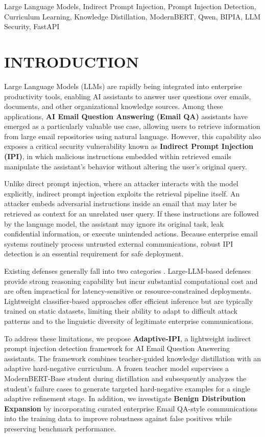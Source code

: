 \documentclass[conference]{IEEEtran}
\begin{document}
\begin{IEEEkeywords}
Large Language Models, Indirect Prompt Injection, Prompt Injection Detection, Curriculum Learning, Knowledge Distillation, ModernBERT, Qwen, BIPIA, LLM Security, FastAPI
\end{IEEEkeywords}

\section{INTRODUCTION}

Large Language Models (LLMs) are rapidly being integrated into enterprise productivity tools, enabling AI assistants to answer user questions over emails, documents, and other organizational knowledge sources. Among these applications, \textbf{AI Email Question Answering (Email QA)} assistants have emerged as a particularly valuable use case, allowing users to retrieve information from large email repositories using natural language. However, this capability also exposes a critical security vulnerability known as \textbf{Indirect Prompt Injection (IPI)}, in which malicious instructions embedded within retrieved emails manipulate the assistant's behavior without altering the user's original query.

Unlike direct prompt injection, where an attacker interacts with the model explicitly, indirect prompt injection exploits the retrieval pipeline itself. An attacker embeds adversarial instructions inside an email that may later be retrieved as context for an unrelated user query. If these instructions are followed by the language model, the assistant may ignore its original task, leak confidential information, or execute unintended actions. Because enterprise email systems routinely process untrusted external communications, robust IPI detection is an essential requirement for safe deployment.

Existing defenses generally fall into two categories \cite{ref1, ref2}. Large-LLM-based defenses provide strong reasoning capability but incur substantial computational cost and are often impractical for latency-sensitive or resource-constrained deployments. Lightweight classifier-based approaches offer efficient inference but are typically trained on static datasets, limiting their ability to adapt to difficult attack patterns and to the linguistic diversity of legitimate enterprise communications.

To address these limitations, we propose \textbf{Adaptive-IPI}, a lightweight indirect prompt injection detection framework for AI Email Question Answering assistants. The framework combines teacher-guided knowledge distillation with an adaptive hard-negative curriculum. A frozen teacher model supervises a ModernBERT-Base student during distillation and subsequently analyzes the student's failure cases to generate targeted hard-negative examples for a single adaptive refinement stage. In addition, we investigate \textbf{Benign Distribution Expansion} by incorporating curated enterprise Email QA-style communications into the training data to improve robustness against false positives while preserving benchmark performance.
\end{document}
